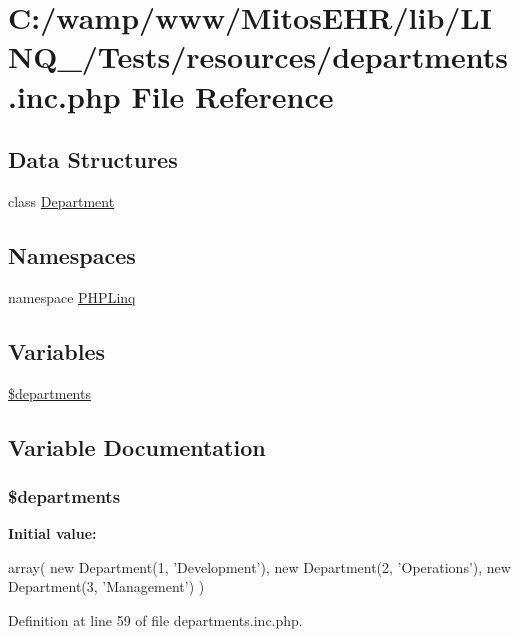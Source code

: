 \hypertarget{departments_8inc_8php}{\section{\-C\-:/wamp/www/\-Mitos\-E\-H\-R/lib/\-L\-I\-N\-Q\-\_/\-Tests/resources/departments.inc.\-php \-File \-Reference}
\label{departments_8inc_8php}
}
\subsection*{\-Data \-Structures}
\begin{DoxyCompactItemize}
\item 
class \hyperlink{class_department}{\-Department}
\end{DoxyCompactItemize}
\subsection*{\-Namespaces}
\begin{DoxyCompactItemize}
\item 
namespace \hyperlink{namespace_p_h_p_linq}{\-P\-H\-P\-Linq}
\end{DoxyCompactItemize}
\subsection*{\-Variables}
\begin{DoxyCompactItemize}
\item 
\hyperlink{departments_8inc_8php_ae2ea4305886b612a4ca8efa178aaec9c}{\$departments}
\end{DoxyCompactItemize}


\subsection{\-Variable \-Documentation}
\hypertarget{departments_8inc_8php_ae2ea4305886b612a4ca8efa178aaec9c}{
\subsubsection[{\$departments}]{\setlength{\rightskip}{0pt plus 5cm}\$departments}}\label{departments_8inc_8php_ae2ea4305886b612a4ca8efa178aaec9c}
{\bfseries \-Initial value\-:}
\begin{DoxyCode}
 array(
        new Department(1, 'Development'),
        new Department(2, 'Operations'),
        new Department(3, 'Management')
)
\end{DoxyCode}


\-Definition at line 59 of file departments.\-inc.\-php.

